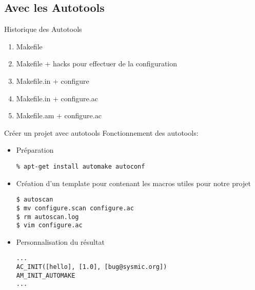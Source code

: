 \subsection{Avec les Autotools}

\begin{frame}[fragile=singleslide]{Historique des Autotools}
  \begin{enumerate}
  \item Makefile
  \item Makefile + hacks pour effectuer de la configuration
  \item Makefile.in + configure
  \item Makefile.in + configure.ac
  \item Makefile.am + configure.ac
  \end{enumerate}
\end{frame}

\begin{frame}[fragile=singleslide]{Créer un projet avec autotools}
  Fonctionnement des autotools:
  \begin{itemize}
  \item Préparation 
\begin{lstlisting}
% apt-get install automake autoconf
\end{lstlisting}
  \item  Création  d'un  template  pour   contenant  les
    macros utiles pour notre projet
\begin{lstlisting}
$ autoscan
$ mv configure.scan configure.ac
$ rm autoscan.log
$ vim configure.ac
\end{lstlisting}
  \item Personnalisation du résultat
\begin{lstlisting}
...
AC_INIT([hello], [1.0], [bug@sysmic.org])
AM_INIT_AUTOMAKE
...
\end{lstlisting}
  \end{itemize}
\end{frame}

